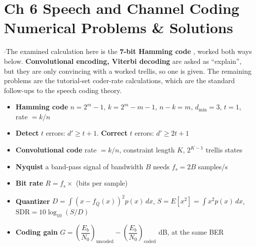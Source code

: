 \section*{\color{acc}Ch 6 \textperiodcentered{} Speech and Channel Coding \gap
\textcolor{sub}{Numerical Problems \& Solutions}}
\vspace{-4pt}{\color{acc}\rule{\textwidth}{1.1pt}}\vspace{4pt}

{\color{sub}\footnotesize {} \gap$\cdot$\gap The examined calculation here is the \textbf{7-bit Hamming code}
, worked both ways below. \textbf{Convolutional encoding, Viterbi
decoding}  are asked as ``explain'', but they are only convincing with a worked trellis, so
one is given. The remaining problems are the tutorial-set coder-rate calculations, which are the
standard follow-ups to the speech coding theory.}

\begin{itemize}
  \item \textbf{Hamming code} \; $n = 2^m - 1$, \; $k = 2^m - m - 1$, \; $n-k = m$, \;
        $d_{\min} = 3$, \; $t = 1$, \; rate $= k/n$
  \item \textbf{Detect} $t$ errors: $d' \ge t+1$. \qquad \textbf{Correct} $t$ errors:
        $d' \ge 2t+1$
  \item \textbf{Convolutional code} \; rate $= k/n$, \; constraint length $K$, \;
        $2^{K-1}$ trellis states
  \item \textbf{Nyquist} \; a band-pass signal of bandwidth $B$ needs $f_s = 2B$ samples/s
  \item \textbf{Bit rate} \; $R = f_s \times$ (bits per sample)
  \item \textbf{Quantizer} \;
        $D = \displaystyle\int (x - f_Q(x))^2 p(x)\,dx$, \quad
        $S = E[x^2] = \displaystyle\int x^2 p(x)\,dx$, \quad
        $\text{SDR} = 10\log_{10}(S/D)$
  \item \textbf{Coding gain} \;
        $G = \left(\dfrac{E_b}{N_0}\right)_{\text{uncoded}}
           - \left(\dfrac{E_b}{N_0}\right)_{\text{coded}}$ dB, at the same BER
\end{itemize}

\hr

